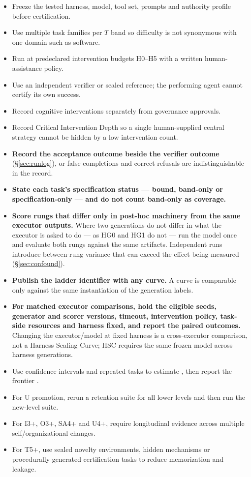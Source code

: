 \begin{itemize}
\item Freeze the tested harness, model, tool set, prompts and authority profile before certification.
\item Use multiple task families per $T$ band so difficulty is not synonymous with one domain such as software.
\item Run at predeclared intervention budgets H0--H5 with a written human-assistance policy.
\item Use an independent verifier or sealed reference; the performing agent cannot certify its own success.
\item Record cognitive interventions separately from governance approvals.
\item Record Critical Intervention Depth so a single human-supplied central strategy cannot be hidden by a low intervention count.
\item \textbf{Record the acceptance outcome beside the verifier outcome} (\S\ref{sec:runlog}), or false completions and correct refusals are indistinguishable in the record.
\item \textbf{State each task's specification status --- bound, band-only or specification-only --- and do not count band-only as coverage.}
\item \textbf{Score rungs that differ only in post-hoc machinery from the same executor outputs.} Where two generations do not differ in what the executor is asked to do --- as HG0 and HG1 do not --- run the model once and evaluate both rungs against the same artifacts. Independent runs introduce between-rung variance that can exceed the effect being measured (\S\ref{sec:confound}).
\item \textbf{Publish the ladder identifier with any curve.} A curve is comparable only against the same instantiation of the generation labels.
\item \textbf{For matched executor comparisons, hold the eligible seeds, generator and scorer versions, timeout, intervention policy, task-side resources and harness fixed, and report the paired outcomes.} Changing the executor/model at fixed harness is a cross-executor comparison, not a Harness Scaling Curve; HSC requires the same frozen model across harness generations.
\item Use confidence intervals and repeated tasks to estimate \SA{}, then report the frontier \FA{}.
\item For U promotion, rerun a retention suite for all lower levels and then run the new-level suite.
\item For I3+, O3+, SA4+ and U4+, require longitudinal evidence across multiple self/organizational changes.
\item For T5+, use sealed novelty environments, hidden mechanisms or procedurally generated certification tasks to reduce memorization and leakage.
\end{itemize}

